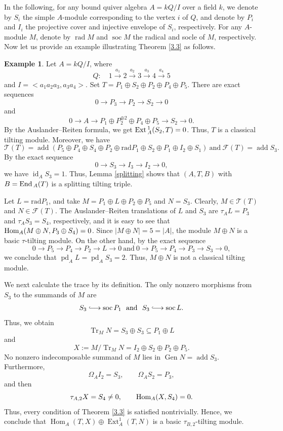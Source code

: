 \documentclass[reqno,12pt]{amsart}
\numberwithin{equation}{section}
\def\Ext{\mbox{\rm Ext}\,} \def\Hom{\mbox{\rm Hom}} \def\dim{\mbox{\rm dim}} \def\Iso{\mbox{\rm Iso}\,}
\def\End{\mbox{\rm End}\,}\def\D{\mbox{\rm D}\,}
\theoremstyle{plain}
\theoremstyle{definition}
\newtheorem{example}[theorem]{\bf Example}
\begin{document}
In the following, for any bound quiver algebra $A=kQ/I$ over a field $k$, we denote by $S_i$ the simple $A$-module corresponding to the vertex $i$ of $Q$, and denote by $P_i$ and $I_i$ the projective cover and injective envelope of $S_i$, respectively. For any $A$-module $M$, denote by $\operatorname{rad}M$ and $\operatorname{soc}M$ the radical and socle of $M$, respectively.
Now let us provide an example illustrating Theorem \ref{3.3} as follows.
\begin{example}\label{genuine-example}
Let $A=kQ/I$, where
\[
Q:\quad 1\overset{a_1}\longrightarrow2\overset{a_2}\longrightarrow3\overset{a_3}\longrightarrow4\overset{a_4}\longrightarrow5
\]
and $I=<a_1a_2a_3,a_3a_4>$.
Set $T=P_1\oplus S_2\oplus P_2\oplus P_4\oplus P_5$.
There are exact sequences
\[
0\longrightarrow P_3\longrightarrow P_2\longrightarrow S_2\longrightarrow0
\]
and
\[
0\longrightarrow A\longrightarrow
P_1\oplus P_2^{\oplus2}\oplus P_4\oplus P_5
\longrightarrow S_2\longrightarrow0.
\]
By the Auslander--Reiten formula, we get $\Ext_A^1(S_2,T)=0$. Thus, $T$ is a classical tilting module. Moreover, we have
\[
  \mathcal{T}(T)=\operatorname{add}(P_5\oplus P_4 \oplus S_4\oplus P_2\oplus \text{rad}P_1\oplus S_2\oplus P_1\oplus I_2\oplus S_1)~\text{and}~ \mathcal{F}(T)=\operatorname{add}S_3.
\]
By the exact sequence
\[
0\longrightarrow S_3\longrightarrow I_3
\longrightarrow I_2\longrightarrow0,
\]
we have $\operatorname{id}_AS_3=1$. Thus, Lemma \ref{splitting} shows that
$(A,T,B)$ with $B=\End_A(T)$ is a splitting tilting triple.

Let $L=\text{rad}P_1$, and take
$M=P_1\oplus L\oplus P_2\oplus P_5$ and $N=S_3$. Clearly,
$M\in\mathcal{T}(T)$ and $N\in\mathcal{F}(T)$. The
Auslander--Reiten translations of $L$ and $S_3$ are $\tau_AL=P_3$ and $\tau_AS_3=S_4$, respectively,
and it is easy to see that
$\Hom_A(M\oplus N,P_3\oplus S_4)=0$.
Since $|M\oplus N|=5=|A|$, the module $M\oplus N$ is a basic $\tau$-tilting module. On the other hand, by the exact sequence
\[
0\longrightarrow P_5\longrightarrow P_4\longrightarrow P_2
\longrightarrow L\longrightarrow0~\text{and}~
0\longrightarrow P_5\longrightarrow P_4\longrightarrow P_3
\longrightarrow S_3\longrightarrow0,
\]
we conclude that $\operatorname{pd}_AL=\operatorname{pd}_AS_3=2$. Thus, $M\oplus N$ is not a classical tilting module.

We next calculate the trace by its definition. The only nonzero morphisms from $S_3$ to the summands of $M$ are
\[
S_3\lhook\joinrel\longrightarrow\operatorname{soc}P_1~~\text{and}~~
S_3\lhook\joinrel\longrightarrow\operatorname{soc}L.
\]
Thus, we obtain
\[
\operatorname{Tr}_MN
=S_3\oplus S_3\subseteq P_1\oplus L
\]
and
\[
X:=M/\operatorname{Tr}_MN
=I_2\oplus S_2\oplus P_2\oplus P_5.
\]
No nonzero indecomposable summand of $M$ lies in
$\operatorname{Gen} N=\operatorname{add}S_3$. Furthermore,
\[
\Omega_AI_2=S_3,\qquad \Omega_AS_2=P_3,
\]
and then
\[
\tau_{A,2}X=S_4\neq0,\qquad \Hom_A(X,S_4)=0.
\]
Thus, every condition of Theorem \ref{3.3} is satisfied nontrivially. Hence, we conclude that  \(
\operatorname{Hom}_A(T,X)\oplus\operatorname{Ext}_A^1(T,N)
\)
is a basic \( \tau_{B,2} \)-tilting module.


\end{example}
\end{document}
